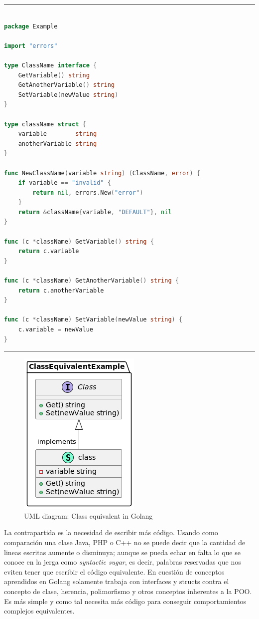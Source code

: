 \newpage
\hrule
\begin{lstlisting}[language=Go,caption={UML diagram: Class equivalent in Golang},breaklines=true,label={lst:golang class equivalent}]

package Example

import "errors"

type ClassName interface {
	GetVariable() string
	GetAnotherVariable() string
	SetVariable(newValue string)
}

type className struct {
	variable        string
	anotherVariable string
}

func NewClassName(variable string) (ClassName, error) {
	if variable == "invalid" {
		return nil, errors.New("error")
	}
	return &className{variable, "DEFAULT"}, nil
}

func (c *className) GetVariable() string {
	return c.variable
}

func (c *className) GetAnotherVariable() string {
	return c.anotherVariable
}

func (c *className) SetVariable(newValue string) {
	c.variable = newValue
}
\end{lstlisting}
\hrule

\begin{figure}[H]
    \centering
    \includegraphics[height=0.25\textheight]{./part/Proyecto_ejecutivo/memoria_constructiva/ClassEquivalentInGolang}
    \caption{UML diagram: Class equivalent in Golang}\label{fig: uml Diagram Class Equivalent in Golang}
\end{figure}

La contrapartida es la necesidad de escribir más código.
Usando como comparación una clase Java, PHP o C++ no se puede decir que la cantidad de lineas escritas aumente o disminuya;
aunque se pueda echar en falta lo que se conoce en la jerga como \textit{syntactic sugar}, es decir, palabras reservadas que nos eviten tener que escribir el código equivalente.
En cuestión de conceptos aprendidos en Golang solamente trabaja con interfaces y structs contra el concepto de clase, herencia, polimorfismo y otros conceptos inherentes a la POO\@.
Es más simple y como tal necesita más código para conseguir comportamientos complejos equivalentes.

